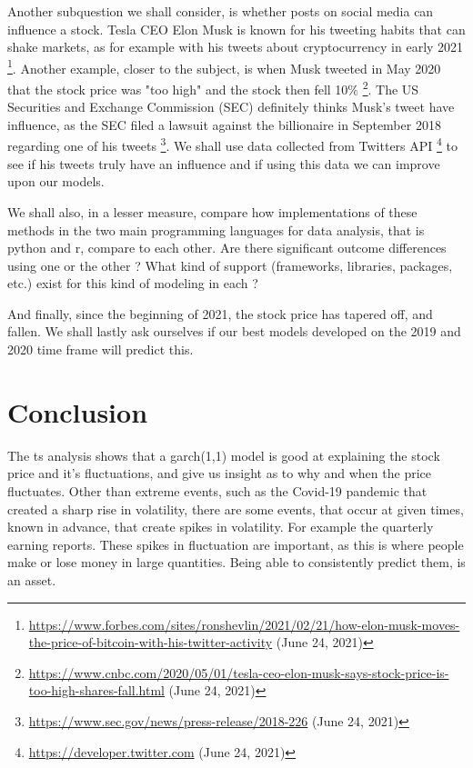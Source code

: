 \documentclass[10pt]{report}
\begin{document}
Another subquestion we shall consider, is whether posts on social media can influence a stock.
Tesla CEO Elon Musk is known for his tweeting habits that can shake markets, as for example with his tweets about cryptocurrency in early 2021 \footnote{\url{https://www.forbes.com/sites/ronshevlin/2021/02/21/how-elon-musk-moves-the-price-of-bitcoin-with-his-twitter-activity} (June 24, 2021)}. Another example, closer to the subject, is when Musk tweeted in May 2020 that the stock price was "too high" and the stock then fell 10$\%$ \footnote{\url{https://www.cnbc.com/2020/05/01/tesla-ceo-elon-musk-says-stock-price-is-too-high-shares-fall.html} (June 24, 2021)}. The US Securities and Exchange Commission (SEC) definitely thinks Musk's tweet have influence, as the SEC filed a lawsuit against the billionaire in September 2018 regarding one of his tweets \footnote{\url{https://www.sec.gov/news/press-release/2018-226} (June 24, 2021)}. We shall use data collected from Twitters \Gls{API} \footnote{\url{https://developer.twitter.com} (June 24, 2021)} to see if his tweets truly have an influence and if using this data we can improve upon our models.


We shall also, in a lesser measure, compare how implementations of these methods in the two main programming languages for data analysis, that is \Gls{python} and \Gls{r}, compare to each other. Are there significant outcome differences using one or the other ? What kind of support (frameworks, libraries, packages, etc.) exist for this kind of modeling in each ?

And finally, since the beginning of 2021, the stock price has tapered off, and fallen. We shall lastly ask ourselves if our best models developed on the 2019 and 2020 time frame will predict this.











\chapter{Conclusion}
\label{chap:conclusion}

The \acrlong{ts} analysis shows that a \acrshort{garch}(1,1) model is good at explaining the stock price and it's fluctuations, and give us insight as to why and when the price fluctuates. Other than extreme events, such as the Covid-19 pandemic that created a sharp rise in volatility, there are some events, that occur at given times, known in advance, that create spikes in volatility. For example the quarterly earning reports. These spikes in fluctuation are important, as this is where people make or lose money in large quantities. Being able to consistently predict them, is an asset.
\end{document}
